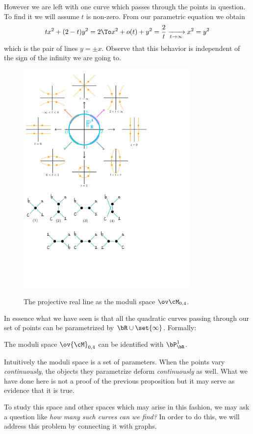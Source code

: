\documentclass[12pt]{memoir}
\begin{document}
    However we are left with one curve which passes through the points in question. To find it we will assume $t$ is non-zero. From our parametric equation we obtain 
    $$tx^2+(2-t)y^2=2\To x^2+o(t)+y^2=\frac{2}{t}\xrightarrow[t\to\infty]{}x^2=y^2$$
    which is the pair of lines $y=\pm x$. Observe that this behavior is independent of the sign of the infinity we are going to. 
    \begin{figure}[h!]
        \centering
        \includegraphics[width=0.8\textwidth, trim= 0.25cm 13.1cm 5.25cm 0.5cm,clip]{fig2.pdf}
        \label{fig2}
        \caption{The projective real line as the moduli space $\ov\cM_{0,4}$.}
    \end{figure}
    In essence what we have seen is that all the quadratic curves passing through our set of points can be parametrized by $\bR\cup\set{\infty}$. Formally:
    \begin{Prop}\label{prop:cM04barIsomP1}
    The moduli space $\ov{\cM}_{0,4}$ can be identified with $\bP^1_\bR$.
    \end{Prop}
    Intuitively the moduli space is a set of parameters. When the points vary \emph{continuously}, the objects they parametrize deform \emph{continuously} as well. What we have done here is not a proof of the previous proposition but it may serve as evidence that it is true.\par 
    To study this space and other spaces which may arise in this fashion, we may ask a question like \emph{how many such curves can we find?} In order to do this, we will address this problem by connecting it with graphs. 
    
\end{document}
